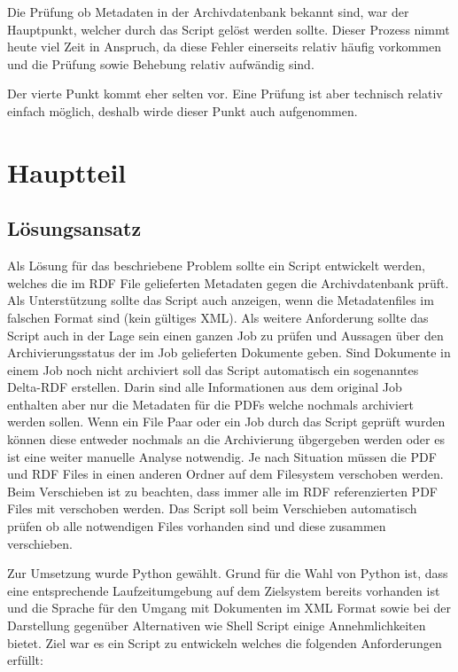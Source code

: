 \documentclass[a4paper,oneside, 12pt]{report}
\begin{document}
Die Prüfung ob Metadaten in der Archivdatenbank bekannt sind, war der Hauptpunkt, welcher durch das Script gelöst werden sollte. Dieser Prozess nimmt heute viel Zeit in Anspruch, da diese Fehler einerseits relativ häufig vorkommen und die Prüfung sowie Behebung relativ aufwändig sind.

Der vierte Punkt kommt eher selten vor. Eine Prüfung ist aber technisch relativ einfach möglich, deshalb wirde dieser Punkt auch aufgenommen. 

\chapter{Hauptteil}\label{sec:motivation}


\section{Lösungsansatz}
Als Lösung für das beschriebene Problem sollte ein Script entwickelt werden, welches die im \ac{RDF} File gelieferten Metadaten gegen die Archivdatenbank prüft. Als Unterstützung sollte das Script auch anzeigen, wenn die Metadatenfiles im falschen Format sind (kein gültiges XML). Als weitere Anforderung sollte das Script auch in der Lage sein einen ganzen Job zu prüfen und Aussagen über den Archivierungsstatus der im Job gelieferten Dokumente geben. Sind Dokumente in einem Job noch nicht archiviert soll das Script automatisch ein sogenanntes Delta-RDF erstellen. Darin sind alle Informationen aus dem original Job enthalten aber nur die Metadaten für die PDFs welche nochmals archiviert werden sollen.
Wenn ein File Paar oder ein Job durch das Script geprüft wurden können diese entweder nochmals an die Archivierung übgergeben werden oder es ist eine weiter manuelle Analyse notwendig. Je nach Situation müssen die PDF und RDF Files in einen anderen Ordner auf dem Filesystem verschoben werden. Beim Verschieben ist zu beachten, dass immer alle im RDF referenzierten PDF Files mit verschoben werden. Das Script soll beim Verschieben automatisch prüfen ob alle notwendigen Files vorhanden sind und diese zusammen verschieben.

Zur Umsetzung wurde Python gewählt. Grund für die Wahl von Python ist, dass eine entsprechende Laufzeitumgebung auf dem Zielsystem bereits vorhanden ist und die Sprache für den Umgang mit Dokumenten im XML Format sowie bei der Darstellung gegenüber Alternativen wie Shell Script einige Annehmlichkeiten bietet. Ziel war es ein Script zu entwickeln welches die folgenden Anforderungen erfüllt:
\end{document}
